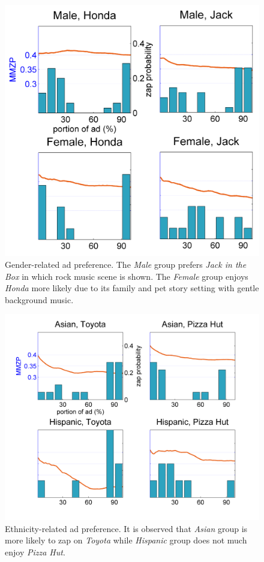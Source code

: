 \documentclass[twoside,leqno,twocolumn]{article}
\begin{document}
\begin{figure}[h]
	\centering
		\includegraphics[width=.8\columnwidth]{fig/ad_gend.png}
	\caption{Gender-related ad preference. The \textit{Male} group prefers \textit{Jack in the Box} in which rock music scene is shown. The \textit{Female} group enjoys \textit{Honda} more likely due to its family and pet story setting with gentle background music.}
	\label{fig:ad_gend}
\end{figure}

\begin{figure}[!t]
	\centering
		\includegraphics[width=.9\columnwidth]{fig/eth_ad.png}
	\caption{Ethnicity-related ad preference. It is observed that \textit{Asian} group is more likely to zap on \textit{Toyota} while \textit{Hispanic} group does not much enjoy \textit{Pizza Hut}.}
	\label{fig:eth_ad}
\end{figure}
\end{document}
